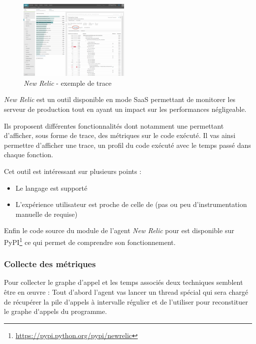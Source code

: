 \begin{figure}
  \vspace{-30pt}
  \begin{center}
    \includegraphics[width=0.48\textwidth]{images/new-relic_trace}
  \end{center}
  \vspace{-22pt}
  \caption{\emph{New Relic} - exemple de trace}
  \vspace{-20pt}
\end{figure}

\emph{New Relic} est un outil disponible en mode \gls{SaaS} permettant de monitorer les serveur de \gls{production} tout en ayant un impact sur les performances négligeable.

Ils proposent différentes fonctionnalités dont notamment une permettant d'afficher, sous forme de trace, des métriques sur le code exécuté. Il vas ainsi permettre d'afficher une trace, un profil du code exécuté avec le temps passé dans chaque fonction.
 
\clearpage
Cet outil est intéressant sur plusieurs points :
\begin{itemize}
  \item Le langage \Python est supporté
  \item L'expérience utilisateur est proche de celle de \Blackfire (pas ou peu d'instrumentation manuelle de requise)
\end{itemize}
  
Enfin le code source du module de l'agent \emph{New Relic} pour \Python est disponible sur \gls{PyPI}\footnote{\url{https://pypi.python.org/pypi/newrelic}} ce qui permet de comprendre son fonctionnement.
  
  \subsubsection{Collecte des métriques}
Pour collecter le graphe d'appel et les temps associés deux techniques semblent être en œuvre :
Tout d'abord l'agent vas lancer un thread spécial qui sera chargé de récupérer la \gls{pile d'appels} à intervalle régulier et de l'utiliser pour reconstituer le \gls{graphe d'appels} du programme.
 
